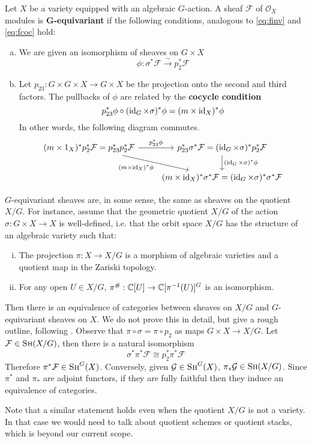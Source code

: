 \begin{definition}
Let $X$ be a variety equipped with an algebraic $G$-action. A sheaf $\mathcal{F}$ of 
$\mathcal{O}_X$ modules is \textbf{G-equivariant} if the following conditions, analogous 
to \ref{eq:finv} and \ref{eq:fcoc} hold:
\begin{enumerate}[(a)]
\item We are given an isomorphism of sheaves on $G\times X$
\[	\phi : \sigma^* \mathcal{F} \overset{\sim}{\to} p_2^* \mathcal{F}	\]
\item Let $p_{23}:G\times G \times X \to G\times X$ be the projection onto the second
and third factors. The pullbacks of $\phi$ are related by the \textbf{cocycle condition}
\[	p_{23}^* \phi \circ (\operatorname{id}_G \times \sigma)^* \phi = (m \times \operatorname{id}_X)^* \phi	\]
In other words, the following diagram commutes.
\[
\begin{tikzcd}
(m\times 1_X)^*p_2^* \mathcal{F} = p_{23}^* p_2^*\mathcal{F}\arrow{r}{p_{23}^*\phi}\arrow[swap]{dr}{(m\times \id_X)^*\phi}
& p_{23}^* \sigma^* \mathcal{F} = (\id_G \times \sigma)^*p_2^* \mathcal{F}\arrow{d}{(\id_G \times \sigma)^*\phi} \\
& (m\times \id_X)^*\sigma^* \mathcal{F} = (\id_G \times \sigma)^*\sigma^*\mathcal{F}
\end{tikzcd}
\]
\end{enumerate}
\end{definition}

\begin{remark}
$G$-equivariant sheaves are, in some sense, the same as sheaves on the quotient $X/G$. For instance, assume that the 
geometric quotient $X/G$ of the action $\sigma : G\times X \to X$ is well-defined, i.e. that
the orbit space $X/G$ has the structure of an algebraic variety such that:
\begin{enumerate}[(i)]
\item The projection $\pi : X \to X/G$ is a morphism of algebraic varieties and a quotient map in the Zariski topology.
\item For any open $U \in X/G$, $\pi^{\#} : \mathbb{C}[U] \to \mathbb{C}[\pi^{-1}(U)]^G$ is an isomorphism.
\end{enumerate}
Then there is an equivalence of categories between sheaves on $X/G$ and $G$-equivariant sheaves on $X$. We do not
prove this in detail, but give a rough outline, following . Observe that $\pi \circ
\sigma = \pi \circ p_2$ as maps $G\times X \to X/G$. Let $\mathcal{F} \in \textsc{Sh}(X/G)$, then there is a natural
isomorphism
\[	\sigma^* \pi^* \mathcal{F} \cong p_2^* \pi^* \mathcal{F} \]
Therefore $\pi^* \mathcal{F} \in \textsc{Sh}^G(X)$. Conversely, given $\mathcal{G} \in \textsc{Sh}^G(X)$, $\pi_* 
\mathcal{G} \in \textsc{Sh}(X/G)$. Since $\pi^*$ and $\pi_*$ are adjoint functors, if they are fully faithful then they
induce an equivalence of categories. 

Note that a similar statement holds even when the quotient $X/G$ is not a variety. In that case we would need to talk
about quotient schemes or quotient stacks, which is beyond our current scope.
\end{remark}

